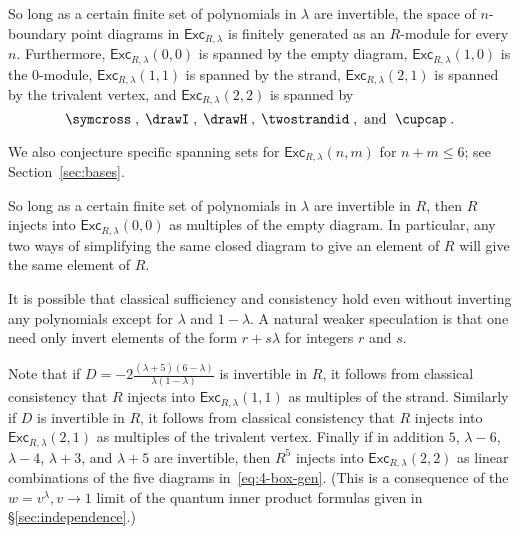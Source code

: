 \documentclass[12pt]{amsart}
\begin{document}
\begin{conjecture}
  \label{conj:class-suffic}
So long as a certain finite set of polynomials in $\lambda$ are invertible,
the space of $n$-boundary point diagrams in $\mathsf{Exc}_{R,\lambda}$ is
finitely generated as an $R$-module for every $n$.  Furthermore,
$\mathsf{Exc}_{R,\lambda}(0,0)$ is spanned by the empty diagram,
$\mathsf{Exc}_{R,\lambda}(1,0)$ is the $0$-module,
$\mathsf{Exc}_{R,\lambda}(1,1)$ is spanned by the strand,
$\mathsf{Exc}_{R,\lambda}(2,1)$ is spanned by the trivalent vertex, and
$\mathsf{Exc}_{R,\lambda}(2,2)$ is spanned by
\begin{equation}\label{eq:4-box-gen}
  \symcross\;, \; \drawI \;,
  \; \drawH \;, \; \twostrandid \;, \text{ and } \; \cupcap \; .
  \end{equation}
\end{conjecture}

We also conjecture specific spanning sets for $\mathsf{Exc}_{R,\lambda}(n,m)$
for $n+m \leq 6$; see Section~\ref{sec:bases}.

\begin{conjecture}
  \label{conj:class-consist}
So long as a certain finite set of polynomials in $\lambda$ are invertible in
$R$, then $R$ injects into $\mathsf{Exc}_{R,\lambda}(0,0)$ as multiples of the
empty diagram.  In particular, any two ways of simplifying the same closed
diagram to give an element of $R$ will give the same element of $R$.
\end{conjecture}

\begin{remark}
  It is possible that classical sufficiency and consistency
  hold even without inverting any polynomials
except for $\lambda$ and $1-\lambda$.  A natural weaker speculation is that one need
only invert elements of the form $r+s\lambda$ for integers $r$ and $s$.
\end{remark}

Note that if $D = -2\frac{(\lambda+5)(6-\lambda)}{\lambda(1-\lambda)}$ is 
invertible in $R$, it follows from classical consistency
that $R$ injects into $\mathsf{Exc}_{R,\lambda}(1,1)$ as multiples of the
strand.  Similarly if $D$ is invertible in $R$, it follows from
classical consistency that $R$ injects into $\mathsf{Exc}_{R,\lambda}(2,1)$ as
multiples of the trivalent vertex.  Finally if in addition
$5$, $\lambda-6$, $\lambda-4$, $\lambda+3$, and $\lambda+5$ are invertible, 
then $R^5$ injects into $\mathsf{Exc}_{R,\lambda}(2,2)$ as
linear combinations of the five diagrams in~\eqref{eq:4-box-gen}.
(This is a consequence of the $w = v^\lambda, v \to 1$ limit
of the quantum inner product formulas given in \S \ref{sec:independence}.)
\end{document}
